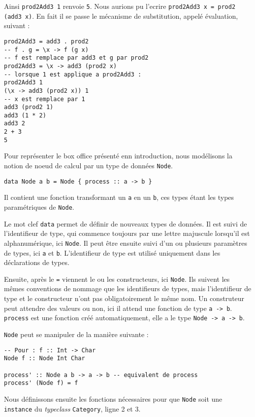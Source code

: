 \documentclass{llncs}
\begin{document}
Ainsi \lstinline{prod2Add3 1} renvoie \lstinline{5}.
Nous aurions pu l'ecrire \lstinline{prod2Add3 x = prod2 (add3 x)}.
En fait il se passe le mécanisme de substitution, appelé évaluation, suivant :
\begin{lstlisting}
prod2Add3 = add3 . prod2
-- f . g = \x -> f (g x)
-- f est remplace par add3 et g par prod2
prod2Add3 = \x -> add3 (prod2 x)
-- lorsque 1 est applique a prod2Add3 :
prod2Add3 1
(\x -> add3 (prod2 x)) 1
-- x est remplace par 1
add3 (prod2 1)
add3 (1 * 2)
add3 2
2 + 3
5
\end{lstlisting}

Pour représenter le box office présenté enn introduction, nous modélisons la notion de noeud de calcul
par un type de données \lstinline{Node}.
\begin{lstlisting}
data Node a b = Node { process :: a -> b }
\end{lstlisting}

Il contient une fonction transformant un \lstinline{a} en un \lstinline{b}, ces
types étant les types paramétriques de \lstinline{Node}.

Le mot clef \lstinline{data} permet de définir de nouveaux types de données.
Il est suivi de l'identifieur de type, qui commence toujours par une lettre
majuscule lorsqu'il est alphanumérique, ici \lstinline{Node}.
Il peut être ensuite suivi d'un ou plusieurs paramètres de types, ici
\lstinline{a} et \lstinline{b}.
L'identifieur de type est utilisé uniquement dans les déclarations de types.

Ensuite, après le \lstinline{=} viennent le ou les constructeurs, ici \lstinline{Node}.
Ils suivent les mêmes conventions de nommage que les identifieurs de types, mais
l'identifieur de type et le constructeur n'ont pas obligatoirement le même nom.
Un construteur peut attendre des valeurs ou non, ici il attend une fonction de
type \lstinline{a -> b}.
\lstinline{process} est une fonction créé automatiquement, elle a le type
\lstinline{Node -> a -> b}.

\lstinline{Node} peut se manipuler de la manière suivante :
\begin{lstlisting}
-- Pour : f :: Int -> Char
Node f :: Node Int Char

process' :: Node a b -> a -> b -- equivalent de process
process' (Node f) = f
\end{lstlisting}

Nous définissons ensuite les fonctions nécessaires pour que \lstinline{Node} soit
une \lstinline{instance} du \emph{typeclass} \lstinline{Category}, ligne 2 et 3.
\end{document}
